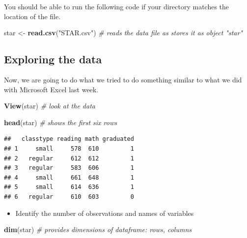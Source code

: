 \documentclass[
]{book}
\newenvironment{Shaded}{\begin{snugshade}}{\end{snugshade}}
\newcommand{\CommentTok}[1]{\textcolor[rgb]{0.56,0.35,0.01}{\textit{#1}}}
\newcommand{\FunctionTok}[1]{\textcolor[rgb]{0.13,0.29,0.53}{\textbf{#1}}}
\newcommand{\NormalTok}[1]{#1}
\newcommand{\OtherTok}[1]{\textcolor[rgb]{0.56,0.35,0.01}{#1}}
\newcommand{\StringTok}[1]{\textcolor[rgb]{0.31,0.60,0.02}{#1}}
\providecommand{\tightlist}{%
  \setlength{\itemsep}{0pt}\setlength{\parskip}{0pt}}
\begin{document}
You should be able to run the following code if your directory matches the location of the file.

\begin{Shaded}
\begin{Highlighting}[]
\NormalTok{star }\OtherTok{\textless{}{-}} \FunctionTok{read.csv}\NormalTok{(}\StringTok{"STAR.csv"}\NormalTok{) }\CommentTok{\# reads the data file as stores it as object "star"}
\end{Highlighting}
\end{Shaded}

\subsection*{Exploring the data}\label{exploring-the-data}

Now, we are going to do what we tried to do something similar to what we did with Microsoft Excel last week.

\begin{Shaded}
\begin{Highlighting}[]
\FunctionTok{View}\NormalTok{(star) }\CommentTok{\# look at the data}
\end{Highlighting}
\end{Shaded}

\begin{Shaded}
\begin{Highlighting}[]
\FunctionTok{head}\NormalTok{(star) }\CommentTok{\# shows the first six rows}
\end{Highlighting}
\end{Shaded}

\begin{verbatim}
##   classtype reading math graduated
## 1     small     578  610         1
## 2   regular     612  612         1
## 3   regular     583  606         1
## 4     small     661  648         1
## 5     small     614  636         1
## 6   regular     610  603         0
\end{verbatim}

\begin{itemize}
\tightlist
\item
  Identify the number of observations and names of variables
\end{itemize}

\begin{Shaded}
\begin{Highlighting}[]
\FunctionTok{dim}\NormalTok{(star) }\CommentTok{\# provides dimensions of dataframe: rows, columns}
\end{Highlighting}
\end{Shaded}
\end{document}
